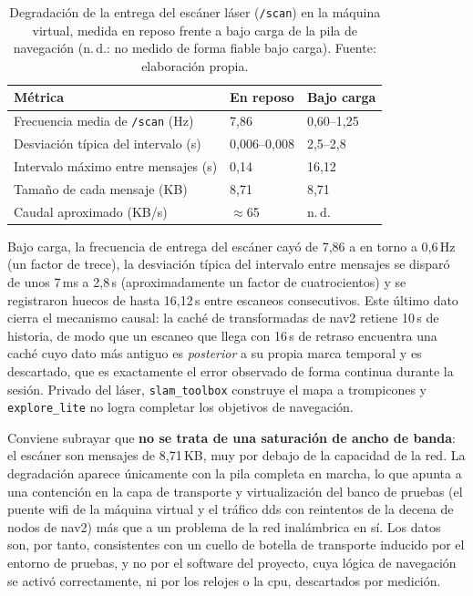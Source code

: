 \begin{table}[htbp]
  \centering
  \small
  \caption{Degradación de la entrega del escáner láser (\texttt{/scan}) en la máquina virtual,
    medida en reposo frente a bajo carga de la pila de navegación (n.\,d.: no medido de forma
    fiable bajo carga). Fuente: elaboración propia.}
  \label{tab:metricas-real-red}
  \begin{tabular}{@{}>{\raggedright\arraybackslash}p{7.2cm} l l@{}}
    \toprule
    \textbf{Métrica} & \textbf{En reposo} & \textbf{Bajo carga} \\
    \midrule
    Frecuencia media de \texttt{/scan} (Hz)          & 7,86        & 0,60--1,25 \\
    Desviación típica del intervalo (s)              & 0,006--0,008 & 2,5--2,8 \\
    Intervalo máximo entre mensajes (s)              & 0,14        & 16,12 \\
    Tamaño de cada mensaje (KB)                      & 8,71        & 8,71 \\
    Caudal aproximado (KB/s)                         & $\approx$65  & n.\,d. \\
    \bottomrule
  \end{tabular}
\end{table}

Bajo carga, la frecuencia de entrega del escáner cayó de 7,86 a en torno a 0,6\,Hz (un factor de
trece), la desviación típica del intervalo entre mensajes se disparó de unos 7\,ms a 2,8\,s (aproximadamente un
factor de cuatrocientos) y se registraron huecos de hasta 16,12\,s entre escaneos consecutivos.
Este último dato cierra el mecanismo causal: la caché de transformadas de \gls{nav2} retiene 10\,s de historia, 
de modo que un escaneo que llega con 16\,s de retraso encuentra
una caché cuyo dato más antiguo es \emph{posterior} a su propia marca temporal y es descartado,
que es exactamente el error observado de forma continua durante la sesión. Privado del láser,
\texttt{slam\_toolbox} construye el mapa a trompicones y \texttt{explore\_lite} no logra completar
los objetivos de navegación.

Conviene subrayar que \textbf{no se trata de una saturación de ancho de banda}: el escáner son
mensajes de 8,71\,KB, muy por debajo de la capacidad de la red. La
degradación aparece únicamente con la pila completa en marcha, lo que apunta a una contención en la
capa de transporte y virtualización del banco de pruebas (el puente wifi de la máquina virtual y el
tráfico \gls{dds} con reintentos de la decena de nodos de \gls{nav2}) más que a un problema de la
red inalámbrica en sí. Los datos son, por tanto, consistentes con un cuello de botella de
transporte inducido por el entorno de pruebas, y no por el software del proyecto, cuya lógica de
navegación se activó correctamente, ni por los relojes o la \gls{cpu}, descartados por medición.


